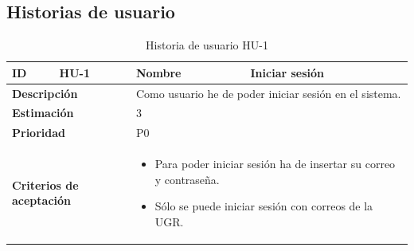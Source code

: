 \subsection{Historias de usuario}

\begin{table}[H]
    \centering
    \begin{tabular}{|p{2cm}|p{4cm}|p{2cm}|p{4cm}|}
        \hline
        \textbf{ID} & HU-1 & \textbf{Nombre} & Iniciar sesión \\
        \hline
        \multicolumn{2}{|p{6cm}|}{\textbf{Descripción}} & \multicolumn{2}{p{6cm}|}{Como usuario he de poder iniciar sesión en el sistema.} \\
        \hline
        \multicolumn{2}{|p{6cm}|}{\textbf{Estimación}} & \multicolumn{2}{p{6cm}|}{3} \\
        \hline
        \multicolumn{2}{|p{6cm}|}{\textbf{Prioridad}} & \multicolumn{2}{p{6cm}|}{P0} \\
        \hline
        \multicolumn{2}{|p{6cm}|}{\textbf{Criterios de aceptación}} & \multicolumn{2}{p{6cm}|}{
            \begin{itemize}
                \item Para poder iniciar sesión ha de insertar su correo y contraseña.
                \item Sólo se puede iniciar sesión con correos de la UGR.
            \end{itemize}
        } \\
        \hline
    \end{tabular}
    \caption{Historia de usuario HU-1}
    \label{tab:hu_1}
\end{table}

